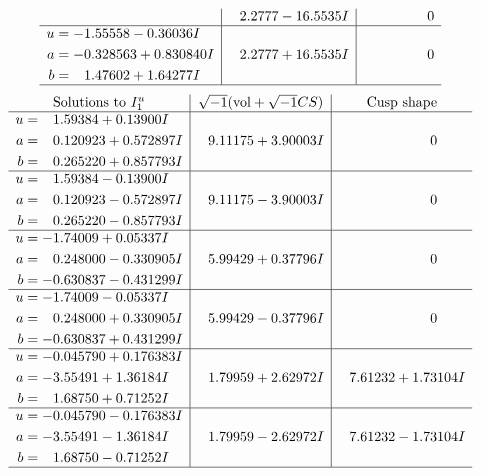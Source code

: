 \documentclass[1p]{elsarticle_modified}
\theoremstyle{definition}
\newcommand{\I}{\sqrt{-1}}
\begin{document}
$$\begin{array}{c|c|c}
 & \phantom{-}2.2777 - 16.5535 I & \phantom{-0.000000 } 0 \\ \hline\begin{aligned}
u &= -1.55558 - 0.36036 I \\
a &= -0.328563 + 0.830840 I \\
b &= \phantom{-}1.47602 + 1.64277 I\end{aligned}
 & \phantom{-}2.2777 + 16.5535 I & \phantom{-0.000000 } 0\\
 \hline 
 \end{array}$$\newpage$$\begin{array}{c|c|c}  
\text{Solutions to }I^u_{1}& \I (\text{vol} + \sqrt{-1}CS) & \text{Cusp shape}\\
 \hline 
\begin{aligned}
u &= \phantom{-}1.59384 + 0.13900 I \\
a &= \phantom{-}0.120923 + 0.572897 I \\
b &= \phantom{-}0.265220 + 0.857793 I\end{aligned}
 & \phantom{-}9.11175 + 3.90003 I & \phantom{-0.000000 } 0 \\ \hline\begin{aligned}
u &= \phantom{-}1.59384 - 0.13900 I \\
a &= \phantom{-}0.120923 - 0.572897 I \\
b &= \phantom{-}0.265220 - 0.857793 I\end{aligned}
 & \phantom{-}9.11175 - 3.90003 I & \phantom{-0.000000 } 0 \\ \hline\begin{aligned}
u &= -1.74009 + 0.05337 I \\
a &= \phantom{-}0.248000 - 0.330905 I \\
b &= -0.630837 - 0.431299 I\end{aligned}
 & \phantom{-}5.99429 + 0.37796 I & \phantom{-0.000000 } 0 \\ \hline\begin{aligned}
u &= -1.74009 - 0.05337 I \\
a &= \phantom{-}0.248000 + 0.330905 I \\
b &= -0.630837 + 0.431299 I\end{aligned}
 & \phantom{-}5.99429 - 0.37796 I & \phantom{-0.000000 } 0 \\ \hline\begin{aligned}
u &= -0.045790 + 0.176383 I \\
a &= -3.55491 + 1.36184 I \\
b &= \phantom{-}1.68750 + 0.71252 I\end{aligned}
 & \phantom{-}1.79959 + 2.62972 I & \phantom{-}7.61232 + 1.73104 I \\ \hline\begin{aligned}
u &= -0.045790 - 0.176383 I \\
a &= -3.55491 - 1.36184 I \\
b &= \phantom{-}1.68750 - 0.71252 I\end{aligned}
 & \phantom{-}1.79959 - 2.62972 I & \phantom{-}7.61232 - 1.73104 I\\
 \hline 
 \end{array}$$\newpage\newpage\renewcommand{\arraystretch}{1}
\end{document}
